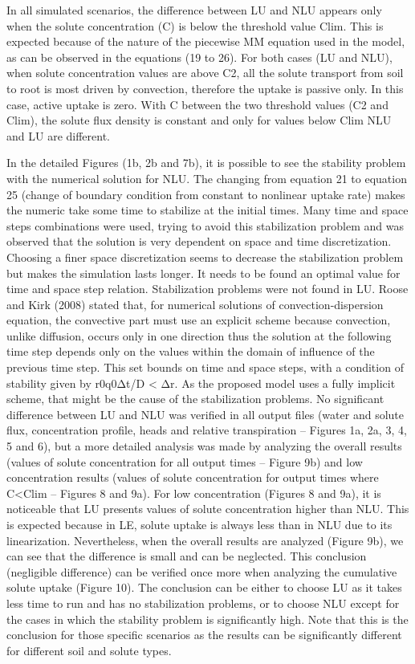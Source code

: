 In all simulated scenarios, the difference between LU and NLU appears only when the solute concentration (C) is below the threshold value Clim. This is expected because of the nature of the piecewise MM equation used in the model, as can be observed in the equations (19 to 26). For both cases (LU and NLU), when solute concentration values are above C2, all the solute transport from soil to root is most driven by convection, therefore the uptake is passive only. In this case, active uptake is zero. With C between the two threshold values (C2 and Clim), the solute flux density is constant and only for values below  Clim NLU and LU are different.

In the detailed Figures (1b, 2b and 7b), it is possible to see the stability problem with the numerical solution for NLU. The changing from equation 21 to equation 25 (change of boundary condition from constant to nonlinear uptake rate) makes the numeric take some time to stabilize at the initial times. Many time and space steps combinations were used, trying to avoid this stabilization problem and was observed that the solution is very dependent on space and time discretization. Choosing a finer space discretization seems to decrease the stabilization problem but makes the simulation lasts longer. It needs to be found an optimal value for time and space step relation. Stabilization problems were not found in LU.
Roose and Kirk (2008) stated that, for numerical solutions of convection-dispersion equation, the convective part must use an explicit scheme because convection, unlike diffusion, occurs only in one direction thus the solution at the following time step depends only on the values within the domain of influence of the previous time step. This set bounds on time and space steps, with a condition of stability given by r0q0Δt/D < Δr. As the proposed model uses a fully implicit scheme, that might be the cause of the stabilization problems.
No significant difference between LU and NLU was verified in all output files (water and solute flux, concentration profile, heads and relative transpiration – Figures 1a, 2a, 3, 4, 5 and 6), but a more detailed analysis was made by analyzing the overall results (values of solute concentration for all output times – Figure 9b) and low concentration results (values of solute concentration for output times where C<Clim – Figures 8 and 9a).
For low concentration (Figures 8 and 9a), it is noticeable that LU presents values of solute concentration higher than NLU. This is expected because in LE, solute uptake is always less than in NLU due to its linearization. Nevertheless, when the overall results are analyzed (Figure 9b), we can see that the difference is small and can be neglected. This conclusion (negligible difference) can be verified once more when analyzing the cumulative solute uptake (Figure 10). 
The conclusion can be either to choose LU as it takes less time to run and has no stabilization problems, or to choose NLU except for the cases in which the stability problem is significantly high. Note that this is the conclusion for those specific scenarios as the results can be significantly different for different soil and solute types.

